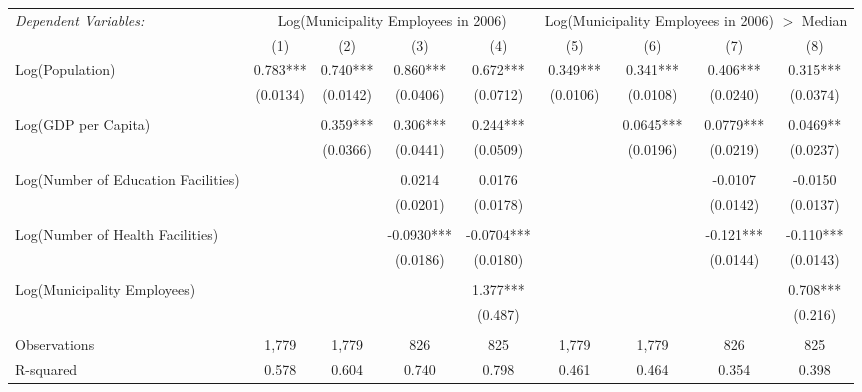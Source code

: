\documentclass[]{article}
\begin{document}
\begin{table}[ht!]
\centering
\begin{adjustbox}{max width=\textwidth}
\begin{tabular}{lcccccccc}
\toprule
\textit{Dependent Variables:} & \multicolumn{4}{c}{{Log(Municipality Employees in 2006)}} & \multicolumn{4}{c}{{Log(Municipality Employees in 2006) $>$ Median}} \\ 
\cmidrule(lr){2-5} \cmidrule(lr){6-9}
 & (1) & (2) & (3) & (4) & (5) & (6) & (7) & (8) \\ 
\midrule
Log(Population) & 0.783*** & 0.740*** & 0.860*** & 0.672*** & 0.349*** & 0.341*** & 0.406*** & 0.315*** \\ 
 & (0.0134) & (0.0142) & (0.0406) & (0.0712) & (0.0106) & (0.0108) & (0.0240) & (0.0374) \\ \\
Log(GDP per Capita) &  & 0.359*** & 0.306*** & 0.244*** &  & 0.0645*** & 0.0779*** & 0.0469** \\ 
 &  & (0.0366) & (0.0441) & (0.0509) &  & (0.0196) & (0.0219) & (0.0237) \\ \\
Log(Number of Education Facilities) &  &  & 0.0214 & 0.0176 &  &  & -0.0107 & -0.0150 \\ 
 &  &  & (0.0201) & (0.0178) &  &  & (0.0142) & (0.0137) \\ \\
Log(Number of Health Facilities) &  &  & -0.0930*** & -0.0704*** &  &  & -0.121*** & -0.110*** \\ 
 &  &  & (0.0186) & (0.0180) &  &  & (0.0144) & (0.0143) \\ \\
Log(Municipality Employees) &  &  &  & 1.377*** &  &  &  & 0.708*** \\ 
 &  &  &  & (0.487) &  &  &  & (0.216) \\\\
\midrule
Observations & 1,779 & 1,779 & 826 & 825 & 1,779 & 1,779 & 826 & 825 \\ 
R-squared & 0.578 & 0.604 & 0.740 & 0.798 & 0.461 & 0.464 & 0.354 & 0.398 \\ 
\bottomrule
\end{tabular}
\end{adjustbox}
\end{table}
\end{document}
